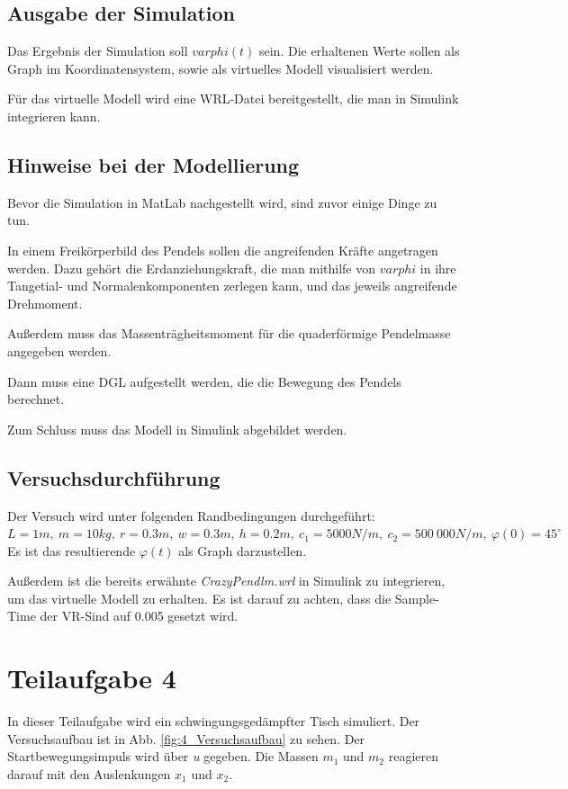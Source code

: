 \documentclass[]{scrartcl}
\begin{document}
\subsection{Ausgabe der Simulation}
Das Ergebnis der Simulation soll $varphi(t)$ sein. Die erhaltenen Werte sollen als Graph im Koordinatensystem, sowie als virtuelles Modell visualisiert werden.

Für das virtuelle Modell wird eine WRL-Datei bereitgestellt, die man in Simulink integrieren kann.

\subsection{Hinweise bei der Modellierung}
Bevor die Simulation in MatLab nachgestellt wird, sind zuvor einige Dinge zu tun.

In einem Freikörperbild des Pendels sollen die angreifenden Kräfte angetragen werden. Dazu gehört die Erdanziehungskraft, die man mithilfe von $varphi$ in ihre Tangetial- und Normalenkomponenten zerlegen kann, und das jeweils angreifende Drehmoment.

Außerdem muss das Massenträgheitsmoment für die quaderförmige Pendelmasse angegeben werden.

Dann muss eine DGL aufgestellt werden, die die Bewegung des Pendels berechnet.

Zum Schluss muss das Modell in Simulink abgebildet werden.

\subsection{Versuchsdurchführung}
Der Versuch wird unter folgenden Randbedingungen durchgeführt: $L=1m,\ m=10kg,\ r=0.3m,\ w=0.3m,\ h=0.2m,\ c_{1}=5000N/m,\ c_{2}=500\ 000N/m,\ \varphi(0)=45^\circ$
Es ist das resultierende $\varphi(t)$ als Graph darzustellen.

Außerdem ist die bereits erwähnte \textit{CrazyPendlm.wrl} in Simulink zu integrieren, um das virtuelle Modell zu erhalten. Es ist darauf zu achten, dass die Sample-Time der VR-Sind auf 0.005 gesetzt wird.

\section{Teilaufgabe 4}
In dieser Teilaufgabe wird ein schwingungsgedämpfter Tisch simuliert. Der Versuchsaufbau ist in Abb. \ref{fig:4_Versuchsaufbau} zu sehen. Der Startbewegungsimpuls wird über \textit{u} gegeben. Die Massen $m_{1}$ und $m_{2}$ reagieren darauf mit den Auslenkungen $x_{1}$ und $x_{2}$.
\end{document}

